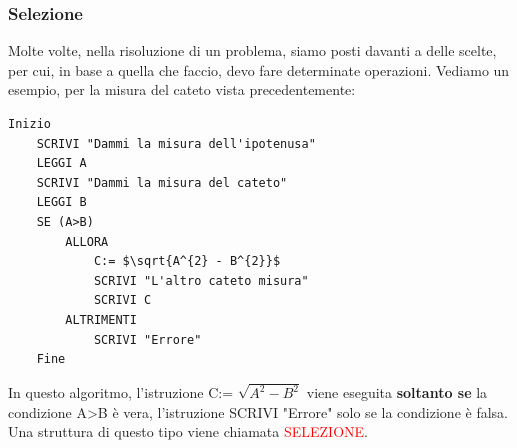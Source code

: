 \documentclass{article}
\begin{document}
	\subsubsection{Selezione}
	Molte volte, nella risoluzione di un problema, siamo posti davanti a delle scelte, per cui, in base a quella che faccio, devo fare determinate operazioni. Vediamo un esempio, per la misura del cateto vista precedentemente:\\
	\begin{lstlisting}[mathescape]
	Inizio
	SCRIVI "Dammi la misura dell'ipotenusa"
	LEGGI A
	SCRIVI "Dammi la misura del cateto"
	LEGGI B
	SE (A>B) 
		ALLORA
			C:= $\sqrt{A^{2} - B^{2}}$
			SCRIVI "L'altro cateto misura"
			SCRIVI C
		ALTRIMENTI
			SCRIVI "Errore"
	Fine		
	\end{lstlisting}
	In questo algoritmo, l'istruzione C:= $\sqrt{A^{2} - B^{2}}$ viene eseguita \textbf{soltanto se} la condizione A>B è vera, l'istruzione SCRIVI "Errore" solo se la condizione è falsa. Una struttura di questo tipo viene chiamata \textcolor{red}{SELEZIONE}.
	
\end{document}
